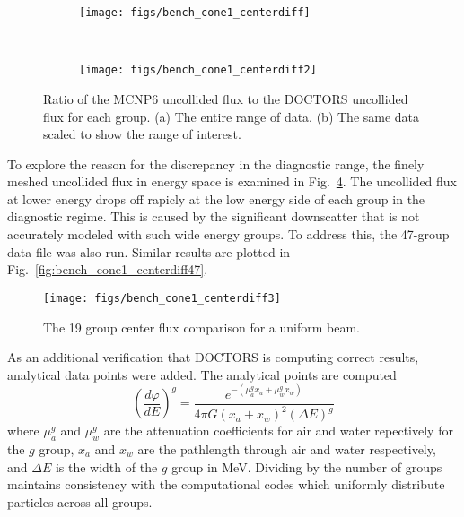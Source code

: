 \begin{figure}
    \centering
    \begin{subfigure}[b]{0.45\textwidth}
        \texttt{[image: figs/bench\_cone1\_centerdiff]}
        \caption{}
        \label{fig:bench_cone1_centerdiff}
    \end{subfigure}
    ~
    \begin{subfigure}[b]{0.45\textwidth}
        \texttt{[image: figs/bench\_cone1\_centerdiff2]}
        \caption{}
        \label{fig:bench_cone1_centerdiff2}
    \end{subfigure}
    \caption{Ratio of the MCNP6 uncollided flux to the DOCTORS uncollided flux for each group. (a) The entire range of data. (b) The same data scaled to show the range of interest. }\label{fig:bench_cone1_centerdifffig}
\end{figure}

To explore the reason for the discrepancy in the diagnostic range, the finely meshed uncollided flux in energy space is examined in Fig.~\ref{fig:bench_cone1_centerdiff3}. The uncollided flux at lower energy drops off rapicly at the low energy side of each group in the diagnostic regime. This is caused by the significant downscatter that is not accurately modeled with such wide energy groups. To address this, the 47-group data file was also run. Similar results are plotted in Fig.~\ref{fig:bench_cone1_centerdiff47}.

\begin{figure}[tb]
  \begin{center}
   \texttt{[image: figs/bench\_cone1\_centerdiff3]}
  \end{center}
  \caption{The 19 group center flux comparison for a uniform beam.}
\label{fig:bench_cone1_centerdiff3}
\end{figure}

As an additional verification that DOCTORS is computing correct results, analytical data points were added. The analytical points are computed
\begin{equation}
\left(\frac{d\varphi}{dE}\right)^g = \frac{e^{-(\mu^g_a x_a + \mu^g_w x_w)}}{4\pi G (x_a + x_w)^2 (\Delta E)^g}
\end{equation}
where $\mu_a^g$ and $\mu_w^g$ are the attenuation coefficients for air and water repectively for the $g$ group, $x_a$ and $x_w$ are the pathlength through air and water respectively, and $\Delta E$ is the width of the $g$ group in MeV. Dividing by the number of groups maintains consistency with the computational codes which uniformly distribute particles across all groups.

